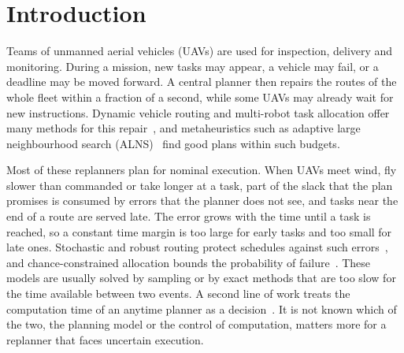 \section{Introduction}\label{sec:intro}
Teams of unmanned aerial vehicles (UAVs) are used for inspection, delivery and monitoring. During a mission, new tasks
may appear, a vehicle may fail, or a deadline may be moved forward. A central planner then repairs the routes of the
whole fleet within a fraction of a second, while some UAVs may already wait for new instructions. Dynamic vehicle
routing and multi-robot task allocation offer many methods for this
repair~\cite{gerkey2004formal,pillac2013review,psaraftis2016dynamic}, and metaheuristics such as adaptive large
neighbourhood search (ALNS)~\cite{ropke2006adaptive} find good plans within such budgets.

Most of these replanners plan for nominal execution. When UAVs meet wind, fly slower than commanded or take longer at a
task, part of the slack that the plan promises is consumed by errors that the planner does not see, and tasks near the
end of a route are served late. The error grows with the time until a task is reached, so a constant time margin is too
large for early tasks and too small for late ones. Stochastic and robust routing protect schedules against such
errors~\cite{errico2016apriori,agra2013robust}, and chance-constrained allocation bounds the probability of
failure~\cite{ponda2012chance}. These models are usually solved by sampling or by exact methods that are too slow for
the time available between two events. A second line of work treats the computation time of an anytime planner as a
decision~\cite{dean1988analysis,russell1991right,zilberstein1996using,svegliato2018meta}. It is not known which of the
two, the planning model or the control of computation, matters more for a replanner that faces uncertain execution.

